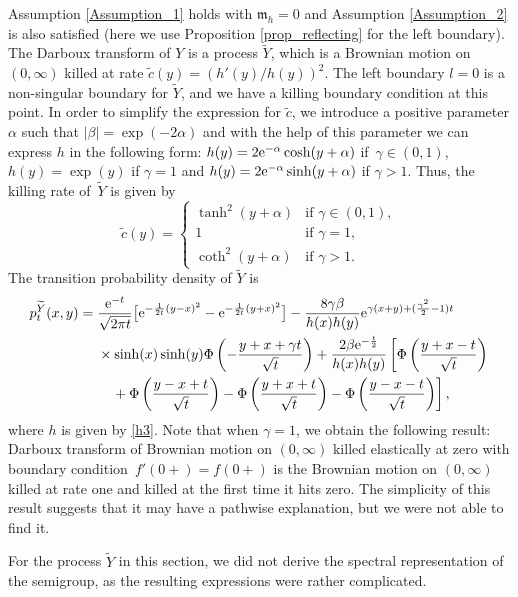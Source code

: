 \documentclass[10pt,a4paper]{amsart}
\numberwithin{equation}{section}
\theoremstyle{definition}
\begin{document}
Assumption \ref{Assumption_1} holds with ${\mathfrak m}_h=0$ and Assumption \ref{Assumption_2} is also satisfied (here we use Proposition \ref{prop_reflecting} for the left boundary). The Darboux transform of $Y$ is a process $\widetilde Y$, which is a Brownian motion on $(0,\infty)$ killed at rate $\tilde c(y)=(h'(y)/h(y))^2$. The left boundary $l=0$ is a non-singular boundary for $\widetilde Y$, and we have a killing boundary condition at this point. In order to simplify the expression for $\tilde c$, we introduce a positive parameter $\alpha$ such that $|\beta|=\exp(-2 \alpha)$ and with the help of this parameter we can express $h$ in the following form: $h(y)=2 {\rm e}^{-\alpha} \cosh(y+\alpha)$ if~${\gamma \in (0,1)}$, $h(y)=\exp(y)$ if $\gamma=1$ and $h(y)=2 {\rm e}^{-\alpha} \sinh(y+\alpha)$ if $\gamma>1$. Thus, the killing rate of~$\widetilde Y$ is given by
\[
\tilde c(y)=
\begin{cases}
\tanh^2(y+\alpha) &\text{if }  \gamma \in (0,1),\\
1  &\text{if }  \gamma=1,\\
\coth^2(y+\alpha)  &\text{if }  \gamma>1.
\end{cases}
\]
The transition probability density of $\widetilde Y$ is
\begin{align}
p^{\widetilde Y}_t(x,y)={}&\frac{{\rm e}^{-t}}{\sqrt{2 \pi t}}\big[ {\rm e}^{-\frac{1}{2t}(y-x)^2}-{\rm e}^{-\frac{1}{2t}(y+x)^2} \big]-\frac{8\gamma \beta}{h(x)h(y)} {\rm e}^{\gamma(x+y)+(\frac{\gamma^2}{2}-1)t}\nonumber\\
&\times\sinh(x) \sinh(y) \Phi\left(-\frac{y+x+\gamma t}{\sqrt{t}}\right)+\frac{2\beta {\rm e}^{-\frac{t}{2}}}{h(x)h(y)} \left[\Phi\left(\frac{y+x-t}{\sqrt{t}}\right)
\right.\nonumber\\
&\left.\phantom{\times}{}+\Phi\left(\frac{y-x+t}{\sqrt{t}}\right)-\Phi\left(\frac{y+x+t}{\sqrt{t}}\right)-\Phi\left(\frac{y-x-t}{\sqrt{t}}\right)\right],\label{p_tilde_Y3}
\end{align}
where $h$ is given by \eqref{h3}. Note that when $\gamma=1$, we obtain the following result: Darboux transform of Brownian motion on $(0,\infty)$ killed elastically at zero with boundary condition~${f'(0+)=f(0+)}$ is the Brownian motion on $(0,\infty)$ killed at rate one and killed at the first time it hits zero. The simplicity of this result suggests that it may have a pathwise explanation, but we were not able to find it.

For the process $\tilde Y$ in this section, we did not derive the spectral representation of the semigroup, as the resulting expressions were rather complicated.
\end{document}
